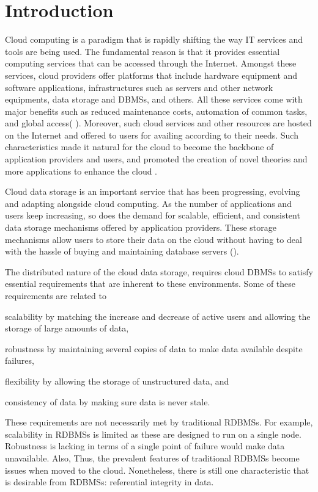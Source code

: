 
\chapter{Introduction} 
Cloud computing is a paradigm that is rapidly shifting the way IT services
and tools are being used. The fundamental reason is that it provides
 essential computing services that can be accessed through the Internet. 
 Amongst these services, cloud providers offer platforms that
 include hardware equipment and software applications, infrastructures such as
 servers and other network equipments, data storage and \acp{DBMS}, and
 others. All these services come with major benefits such as reduced maintenance
 costs,  automation of common tasks, and global access( ). Moreover, such cloud
 services and other resources are hosted on the Internet and offered to  
 users for availing according to their needs.  Such characteristics made it
  natural for the  cloud to become  the backbone of application providers and
  users, and promoted the creation of novel theories and more applications to
 enhance the cloud .
 
  
  Cloud data storage is an important service that has been progressing, evolving
  and adapting alongside cloud computing. As the number of
  applications and users keep increasing, so does the demand for scalable, 
  efficient, and consistent data storage mechanisms offered by
  application providers. These storage mechanisms allow  users to store
  their data on the cloud without having to deal with the hassle of buying and
  maintaining database servers ().

 The distributed nature of the cloud data storage, requires
 cloud \acp{DBMS} to satisfy essential requirements that are inherent to these
 environments. Some of these requirements are related to
  \begin{inparaenum}[a)]
 \item  scalability by matching the increase and decrease of active users
 and allowing the storage of large amounts of data,
 \item  robustness by maintaining several copies of data to make data
 available despite failures,
 \item  flexibility by allowing the storage of unstructured data, and
 \item  consistency of data by making sure data is never stale.
 \end{inparaenum}
   These requirements are not necessarily met by traditional \acp{RDBMS}. For
   example, scalability in \acp{RDBMS} is limited as these are designed to run
   on a single node. Robustness is lacking in terms of  a single point of
   failure would  make data unavailable. Also,     Thus, the  prevalent
   features of traditional \acp{RDBMS}  become issues when moved to the cloud.
    Nonetheless, there is still one characteristic that is desirable from
   \acp{RDBMS}: referential integrity in data.
   
